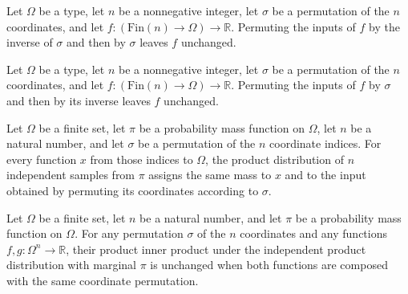 \begin{theorem}
\label{FABL.permuteProductFunction_symm_apply}
\leanok
{}
Let $\Omega$ be a type, let $n$ be a nonnegative integer, let $\sigma$ be a permutation of the
$n$ coordinates, and let $f:(\mathrm{Fin}(n)\to\Omega)\to\mathbb R$. Permuting the inputs of $f$ by
the inverse of $\sigma$ and then by $\sigma$ leaves $f$ unchanged.
\end{theorem}

\begin{theorem}
\label{FABL.permuteProductFunction_apply_symm}
\leanok
{}
Let $\Omega$ be a type, let $n$ be a nonnegative integer, let $\sigma$ be a permutation of the
$n$ coordinates, and let $f:(\mathrm{Fin}(n)\to\Omega)\to\mathbb R$. Permuting the inputs of $f$ by
$\sigma$ and then by its inverse leaves $f$ unchanged.
\end{theorem}

\begin{theorem}
\label{FABL.productProbabilityPMF_permuteProductInput}
\leanok
{}
Let $\Omega$ be a finite set, let $\pi$ be a probability mass function on $\Omega$, let
$n$ be a natural number, and let $\sigma$ be a permutation of the $n$ coordinate
indices. For every function $x$ from those indices to $\Omega$, the product distribution
of $n$ independent samples from $\pi$ assigns the same mass to $x$ and to the input
obtained by permuting its coordinates according to $\sigma$.
\end{theorem}

\begin{theorem}
\label{FABL.productInner_permuteProductFunction}
\leanok
{}
Let $\Omega$ be a finite set, let $n$ be a natural number, and let $\pi$ be a
probability mass function on $\Omega$. For any permutation $\sigma$ of the $n$
coordinates and any functions $f,g:\Omega^n\to\mathbb R$, their product inner product
under the independent product distribution with marginal $\pi$ is unchanged when both
functions are composed with the same coordinate permutation.
\end{theorem}

